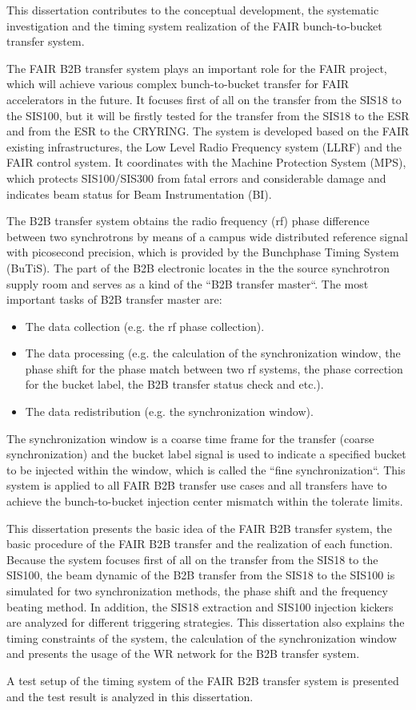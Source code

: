 This dissertation contributes to the conceptual development, the systematic investigation and the timing system realization of the FAIR bunch-to-bucket transfer system. 

The FAIR B2B transfer system plays an important role for the FAIR project, which will achieve various complex bunch-to-bucket transfer for FAIR accelerators in the future. It focuses first of all on the transfer from the SIS18 to the SIS100, but it will be firstly tested for the transfer from the SIS18 to the ESR and from the ESR to the CRYRING. The system is developed based on the FAIR existing infrastructures, the Low Level Radio Frequency system (LLRF) and the FAIR control system. It coordinates with the Machine Protection System (MPS), which protects SIS100/SIS300 from fatal errors and considerable damage and indicates beam status for Beam Instrumentation (BI). 
 
The B2B transfer system obtains the radio frequency (rf) phase difference between two synchrotrons by means of a campus wide distributed reference signal with picosecond precision, which is provided by the Bunchphase Timing System (BuTiS). The part of the B2B electronic locates in the the source synchrotron supply room and serves as a kind of the ``B2B transfer master``. The most important tasks of B2B transfer master are:
\begin{itemize}

	\item 	The data collection (e.g. the rf phase collection). 

   \item 	The data processing (e.g. the calculation of the synchronization window, the phase shift for the phase match between two rf systems, the phase correction for the bucket label, the B2B transfer status check and etc.). 

   \item 	The data redistribution (e.g. the synchronization window).
\end{itemize}
The synchronization window is a coarse time frame for the transfer (coarse synchronization) and the bucket label signal is used to indicate a specified bucket to be injected within the window, which is called the ``fine synchronization``. This system is applied to all FAIR B2B transfer use cases and all transfers have to achieve the bunch-to-bucket injection center mismatch within the tolerate limits.

This dissertation presents the basic idea of the FAIR B2B transfer system, the basic procedure of the FAIR B2B transfer and the realization of each function.
%
Because the system focuses first of all on the transfer from the SIS18 to the SIS100, the beam dynamic of the B2B transfer from the SIS18 to the SIS100 is simulated for two synchronization methods, the phase shift and the frequency beating method. In addition, the SIS18 extraction and SIS100 injection kickers are analyzed for different triggering strategies. This dissertation also explains the timing constraints of the system, the calculation of the synchronization window and presents the usage of the WR network for the B2B transfer system. 

A test setup of the timing system of the FAIR B2B transfer system is presented and the test result is analyzed in this dissertation. 
